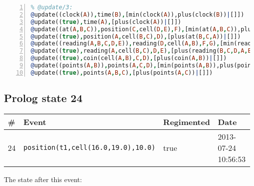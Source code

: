 \documentclass[11pt]{article}\usepackage[utf8]{inputenc}\usepackage{geometry}
\begin{document}
\lstset{breaklines=true}\begin{lstlisting}[language=Prolog, numbers=left]
% Rules with string id: @update
% @update/3:
@update((clock(A)),time(B),[min(clock(A)),plus(clock(B))|[]])
@update((true),time(A),[plus(clock(A))|[]])
@update((at(A,B,C)),position(C,cell(D,E),F),[min(at(A,B,C)),plus(at(D,E,C))|[]])
@update((true),position(A,cell(B,C),D),[plus(at(B,C,A))|[]])
@update((reading(A,B,C,D,E)),reading(D,cell(A,B),F,G),[min(reading(A,B,C,D,E)),plus(reading(A,B,F,D,G))|[]])
@update((true),reading(A,cell(B,C),D,E),[plus(reading(B,C,D,A,E))|[]])
@update((true),coin(cell(A,B),C,D),[plus(coin(A,B))|[]])
@update((points(A,B)),points(A,C,D),[min(points(A,B)),plus(points(A,D))|[]])
@update((true),points(A,B,C),[plus(points(A,C))|[]])

\end{lstlisting}
\clearpage 
\subsection{Prolog state 24}
\begin{table}[ht]
\centering 
\begin{tabular}{l l l l} 
\textbf{\#} & \textbf{Event} & \textbf{Regimented} & \textbf{Date} \\ [0.5ex] 
\hline
24&\texttt{position(t1,cell(16.0,19.0),10.0)}&true&2013-07-24 10:56:53\\ [1ex] \hline\end{tabular}
\end{table}
The state after this event:
\end{document}
